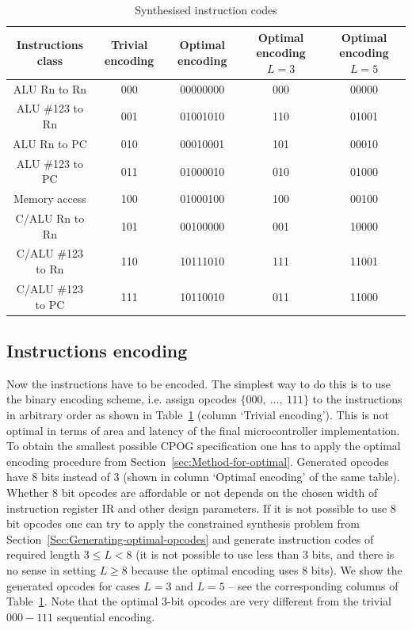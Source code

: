 \begin{table}[h]
\begin{centering}
\begin{tabular}{|c||c|c|c|c|}
\hline 
{\small Instructions class} & {\small Trivial encoding} & {\small Optimal encoding} & {\small Optimal encoding $L=3$} & {\small Optimal encoding $L=5$}\tabularnewline
\hline 
\hline 
{\small ALU Rn to Rn} & {\small 000} & {\small 00000000} & {\small 000} & {\small 00000}\tabularnewline
\hline 
{\small ALU \#123 to Rn} & {\small 001} & {\small 01001010} & {\small 110} & {\small 01001}\tabularnewline
\hline 
{\small ALU Rn to PC} & {\small 010} & {\small 00010001} & {\small 101} & {\small 00010}\tabularnewline
\hline 
{\small ALU \#123 to PC} & {\small 011} & {\small 01000010} & {\small 010} & {\small 01000}\tabularnewline
\hline 
{\small Memory access} & {\small 100} & {\small 01000100} & {\small 100} & {\small 00100}\tabularnewline
\hline 
{\small C/ALU Rn to Rn} & {\small 101} & {\small 00100000} & {\small 001} & {\small 10000}\tabularnewline
\hline 
{\small C/ALU \#123 to Rn} & {\small 110} & {\small 10111010} & {\small 111} & {\small 11001}\tabularnewline
\hline 
{\small C/ALU \#123 to PC} & {\small 111} & {\small 10110010} & {\small 011} & {\small 11000}\tabularnewline
\hline 
\end{tabular}
\par\end{centering}

\caption{Synthesised instruction codes\label{tab:Synthesised-instruction-codes}}
\end{table}



\subsection{Instructions encoding}

Now the instructions have to be encoded. The simplest way to do this
is to use the binary encoding scheme, i.e. assign opcodes $\{000,\ \dots,\ 111\}$
to the instructions in arbitrary order as shown in Table~\ref{tab:Synthesised-instruction-codes}
(column `Trivial encoding'). This is not optimal in terms of area
and latency of the final microcontroller implementation. To obtain
the smallest possible CPOG specification one has to apply the optimal
encoding procedure from Section~\ref{sec:Method-for-optimal}. Generated
opcodes have 8 bits instead of 3 (shown in column `Optimal encoding'
of the same table). Whether 8 bit opcodes are affordable or not depends
on the chosen width of instruction register IR and other design parameters.
If it is not possible to use 8 bit opcodes one can try to apply the
constrained synthesis problem from Section~\ref{Sec:Generating-optimal-opcodes}
and generate instruction codes of required length $3\le L<8$ (it
is not possible to use less than 3 bits, and there is no sense in
setting $L\ge8$ because the optimal encoding uses 8 bits). We show
the generated opcodes for cases $L=3$ and $L=5$ -- see the corresponding
columns of Table~\ref{tab:Synthesised-instruction-codes}. Note that
the optimal 3-bit opcodes are very different from the trivial $000-111$
sequential encoding.

